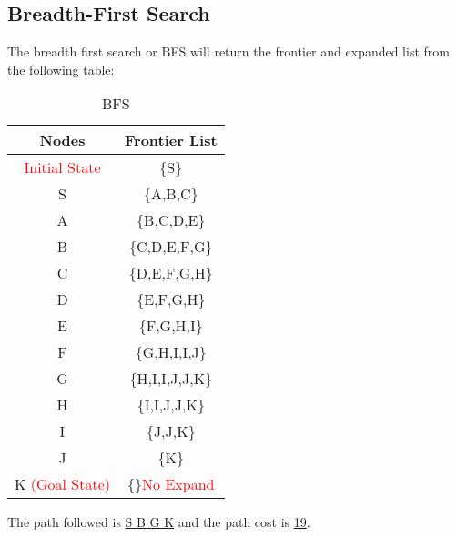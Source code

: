 \documentclass{article}
\begin{document}
	\subsection{Breadth-First Search}
	The breadth first search or BFS will return the frontier and expanded list from the following table:\\
	\vspace{-2pc}
	\begin{table}[H]
		\centering

		\caption{BFS}

		\label{tab:table1}

		\begin{tabular}{|c|c|}

			\toprule
			Nodes & Frontier List\\
			\midrule

			\textcolor{red}{Initial State} & \{S\}\\
    		\hline
    		S & \{A,B,C\}\\
    		\hline
    		A & \{B,C,D,E\}\\
    		\hline
    		B  & \{C,D,E,F,G\}\\
    		\hline
    		C  & \{D,E,F,G,H\}\\
    		\hline
    		D  & \{E,F,G,H\}\\
    		\hline
    		E  & \{F,G,H,I\}\\
    		\hline
    		F  & \{G,H,I,I,J\}\\
    		\hline
    		G  & \{H,I,I,J,J,K\}\\
    		\hline
    		H  & \{I,I,J,J,K\}\\
    		\hline
    		I  & \{J,J,K\}\\
    		\hline
    		J  & \{K\}\\
    		\hline
    		K \textcolor{red}{(Goal State)}& \{\}\textcolor{red}{No Expand}\\
    		\hline
    		      
		\end{tabular}
	\end{table}
    \vspace{-.5pc}
    The path followed is \underline{S B G K} and the path cost is \underline{19}.
\end{document}
